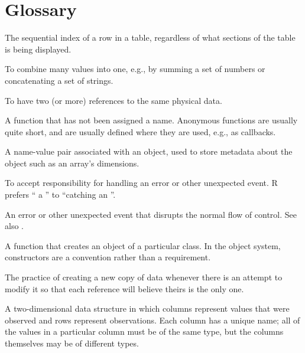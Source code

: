 \chapter{Glossary}\label{glossary}

\begin{description}

The sequential index of a row in a table,
regardless of what sections of the table is being displayed.

To combine many values into one,
e.g.,
by summing a set of numbers or concatenating a set of strings.

To have two (or more) references to the same physical data.

A function that has not been assigned a name.
Anonymous functions are usually quite short,
and are usually defined where they are used,
e.g.,
as callbacks.

A name-value pair associated with an object,
used to store metadata about the object
such as an array's dimensions.

To accept responsibility for handling an error
or other unexpected event.
R prefers `` a ''
to ``catching an ''.

An error or other unexpected event that disrupts the normal flow of control.
See also .

A function that creates an object of a particular class.
In the  object system,
constructors are a convention rather than a requirement.

The practice of creating a new copy of  data
whenever there is an attempt to modify it
so that each reference will believe theirs is the only one.

A two-dimensional data structure
in which columns represent values that were observed
and rows represent observations.
Each column has a unique name;
all of the values in a particular column must be of the same type,
but the columns themselves may be of different types.


\end{description}
